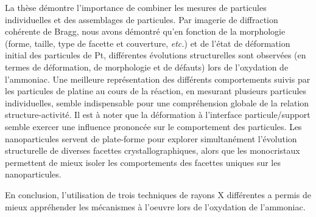 La thèse démontre l’importance de combiner les mesures de particules individuelles et des assemblages de particules.
Par imagerie de diffraction cohérente de Bragg, nous avons démontré qu'en fonction de la morphologie (forme, taille, type de facette et couverture, \textit{etc.}) et de l'état de déformation initial des particules de Pt, différentes évolutions structurelles sont observées (en termes de déformation, de morphologie et de défauts) lors de l'oxydation de l'ammoniac.
Une meilleure représentation des différents comportements suivis par les particules de platine au cours de la réaction, en mesurant plusieurs particules individuelles, semble indispensable pour une compréhension globale de la relation structure-activité.
Il est à noter que la déformation à l’interface particule/support semble exercer une influence prononcée sur le comportement des particules.
Les nanoparticules servent de plate-forme pour explorer simultanément l’évolution structurelle de diverses facettes crystallographiques, alors que les monocristaux permettent de mieux isoler les comportements des facettes uniques sur les nanoparticules.

En conclusion, l'utilisation de trois techniques de rayons X différentes a permis de mieux appréhender les mécanismes à l'oeuvre lors de l'oxydation de l'ammoniac.

\endgroup %

\vspace{\fill} %

\newpage\thispagestyle{empty}\null\newpage